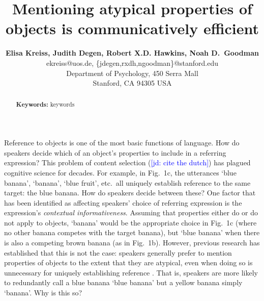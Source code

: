 \documentclass[10pt,letterpaper]{article}
\title{Mentioning atypical properties of objects is communicatively efficient}
\author{{\large \bf Elisa Kreiss, Judith Degen, Robert X.D. Hawkins, Noah D.~Goodman} \\
  ekreiss@uos.de, \{jdegen,rxdh,ngoodman\}@stanford.edu\\
  Department of Psychology, 450 Serra Mall \\
  Stanford, CA 94305 USA}
\newcommand{\jd}[1]{\textcolor{Blue}{[jd: #1]}}
\begin{document}
\maketitle


\begin{abstract}


\textbf{Keywords:} 
keywords
\end{abstract}


Reference to objects is one of the most basic functions of language. How do speakers decide which of an object's properties to include in a referring expression? This problem of content selection (\jd{cite the dutch}) has plagued cognitive science for decades. For example, in Fig.~1c, the utterances `blue banana', `banana', `blue fruit', etc.~all uniquely establish reference to the same target: the blue banana. How do speakers decide between these? One factor that has been identified as affecting speakers' choice of referring expression is the expression's \emph{contextual informativeness}. Assuming that properties either do or do not apply to objects, `banana' would be the appropriate choice in Fig.~1c (where no other banana competes with the target banana), but `blue banana' when there is also a competing brown banana (as in Fig.~1b). However, previous research has established that this is not the case: speakers generally prefer to mention properties of objects to the extent that they are atypical, even when doing so is unnecessary for uniquely establishing reference \cite{sedivy2003a, Mitchell2013, westerbeek2015, rubiofernandez2016}. That is, speakers are more likely to redundantly call a blue banana `blue banana' but a yellow banana simply `banana'. Why is this so?

\end{document}
